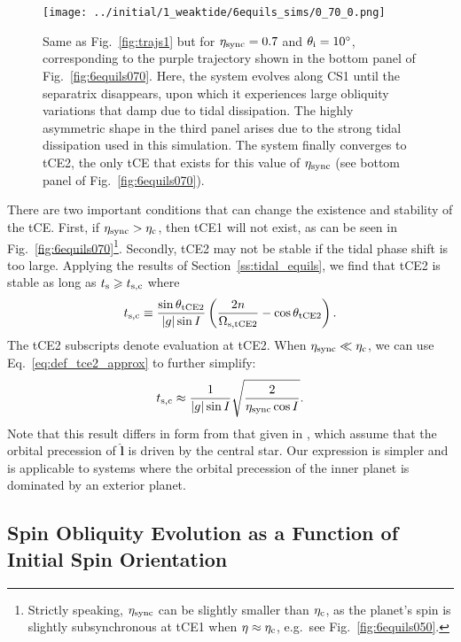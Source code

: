 \documentclass[
        fleqn,
        usenatbib,
    ]{mnras}
\newcommand*{\abs}[1]{\left|#1\right|}
\newcommand*{\p}[1]{\left(#1\right)}
\newcommand*{\uv}[1]{\hat{\boldsymbol{\mathbf{#1}}}}
\begin{document}
\begin{figure}
    \texttt{[image: ../initial/1\_weaktide/6equils\_sims/0\_70\_0.png]}
    \caption{Same as Fig.~\ref{fig:trajs1} but for $\eta_{\rm sync} = 0.7$ and
    $\theta_{\rm i} = 10^\circ$, corresponding to the purple trajectory shown in
    the bottom panel of Fig.~\ref{fig:6equils070}. Here, the system evolves
    along CS1 until the separatrix disappears, upon which it experiences large
    obliquity variations that damp due to tidal dissipation. The highly
    asymmetric shape in the third panel arises due to the strong tidal
    dissipation used in this simulation. The system finally converges to tCE2,
    the only tCE that exists for this value of $\eta_{\rm sync}$ (see bottom
    panel of Fig.~\ref{fig:6equils070}).}\label{fig:trajs3}
\end{figure}

There are two important conditions that can change the existence and stability
of the tCE\@. First, if $\eta_{\rm sync} > \eta_{\rm c}$, then tCE1 will not
exist, as can be seen in Fig.~\ref{fig:6equils070}\footnote{Strictly speaking,
$\eta_{\rm sync}$ can be slightly smaller than $\eta_{\rm c}$, as the planet's
spin is slightly subsynchronous at tCE1 when $\eta \approx \eta_{\rm c}$, e.g.\
see Fig.~\ref{fig:6equils050}.}. Secondly, tCE2 may not be stable if the tidal
phase shift is too large. Applying the results of Section~\ref{ss:tidal_equils},
we find that tCE2 is stable as long as $t_{\rm s} \geq t_{\rm s, c}$ where
\begin{equation}
    t_{\rm s, c} \equiv \frac{\sin \theta_{\rm tCE2}}{\abs{g} \sin
            I}\p{\frac{2n}{\Omega_{\rm s, tCE2}} - \cos \theta_{\rm tCE2}}.
\end{equation}
The tCE2 subscripts denote evaluation at tCE2. When $\eta_{\rm sync} \ll
\eta_{\rm c}$, we can use Eq.~\eqref{eq:def_tce2_approx} to further simplify:
\begin{equation}
    t_{\rm s, c}\approx \frac{1}{\abs{g}\sin I}\sqrt{\frac{2}{\eta_{\rm sync}
        \cos I}}. \label{eq:def_ts_crit}
\end{equation}
Note that this result differs in form from that given in
\citet{fabrycky_otides}, which assume that the orbital precession of $\uv{l}$ is
driven by the central star. Our expression is simpler and is applicable to
systems where the orbital precession of the inner planet is dominated by an
exterior planet.

\subsection{Spin Obliquity Evolution as a Function of Initial Spin Orientation}
\end{document}
